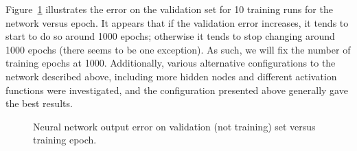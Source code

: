  
Figure~\ref{fig:epochs} illustrates the error on the validation set for 10
training runs for the network versus epoch. It appears that if the validation
error increases, it tends to start to do so around 1000 epochs; otherwise it
tends to stop changing around 1000 epochs (there seems to be one exception). As
such, we will fix the number of training epochs at 1000.  Additionally, various
alternative configurations to the network described above, including more hidden
nodes and different activation functions were investigated, and the
configuration presented above generally gave the best results. 

\begin{figure}
\centering

\vspace*{-5pt}
\caption{Neural network output error on validation (not training) set versus
training epoch.}
\label{fig:epochs}
\end{figure}

